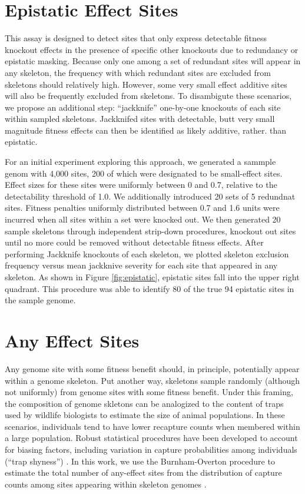 \section{Epistatic Effect Sites}



This assay is designed to detect sites that only express detectable fitness knockout effects in the presence of specific other knockouts due to redundancy or epistatic masking.
Because only one among a set of redundant sites will appear in any skeleton, the frequency with which redundant sites are excluded from skeletons should relatively high.
However, some very small effect additive sites will also be frequently excluded from skeletons.
To disambigute these scenarios, we propose an additional step: ``jackknife'' one-by-one knockouts of each site within sampled skeletons.
Jackknifed sites with detectable, butt very small magnitude fitness effects can then be identified as likely additive,  rather. than epistatic.

For an initial experiment exploring this approach, we generated a sammple genom with 4,000 sites, 200 of which were designated to be small-effect sites.
Effect sizes for these sites were uniformly between 0 and 0.7, relative to the detectability threshold of 1.0.
We additionally introduced 20 sets of 5 redundnat sites.
Fitness penalties uniformly distributed between 0.7 and 1.6 units were incurred when all sites within a set were knocked out.
We then generated 20 sample skeletons through independent strip-down procedures, knockout out sites until no more could be removed without detectable fitness effects.
After performing Jackknife knockouts of each skeleton, we plotted skeleton exclusion frequency versus mean jackknive severity for each site that appeared in any skeleton.
As shown in Figure \ref{fig:epistatic}, epistatic sites fall into the upper right quadrant.
This procedure was able to identify 80 of the true 94 epistatic sites in the sample genome.

\section{Any Effect Sites}

Any genome site with some fitness benefit should, in principle, potentially appear within a genome skeleton.
Put another way, skeletons sample randomly (although not uniformly) from genome sites with some fitness benefit.
Under this framing, the composition of genome skletons can be analogized to the content of traps used by wildlife biologists to estimate the size of animal populations.
In these scenarios, individuals tend to have lower recapture counts when membered within a large population.
Robust statistical procedures have been developed to account for biasing factors, including variation in capture probabilities among individuals (``trap shyness'') \citep{amstrup2010handbook}.
In this work, we use the Burnham-Overton procedure to estimate the total number of any-effect sites from the distribution of capture counts among sites appearing within skeleton genomes \citep{burnham1979robust}.

